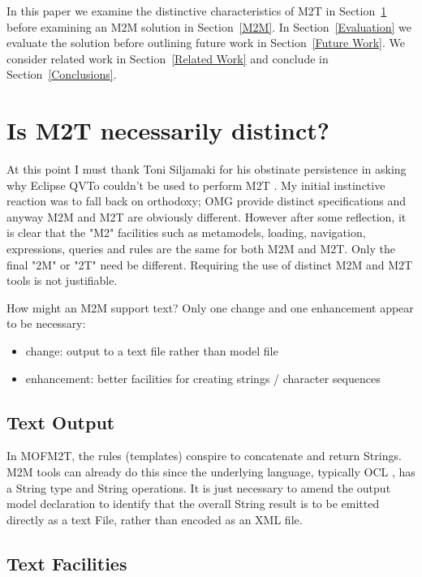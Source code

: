 \documentclass{llncs}
\begin{document}
In this paper we examine the distinctive characteristics of M2T in Section~\ref{M2T} before examining an M2M solution in Section~\ref{M2M}. In Section~\ref{Evaluation} we evaluate the solution before outlining future work in Section~\ref{Future Work}. We consider related work in Section~\ref{Related Work} and conclude in Section~\ref{Conclusions}. 

\section{Is M2T necessarily distinct?}\label{M2T}

At this point I must thank Toni Siljamaki for his obstinate persistence in asking why Eclipse QVTo couldn't be used to perform M2T \cite{Bug396543}. My initial instinctive reaction was to fall back on orthodoxy; OMG provide distinct specifications and anyway M2M and M2T are obviously different. However after some reflection, it is clear that the "M2" facilities such as metamodels, loading, navigation, expressions, queries and rules are the same for both M2M and M2T. Only the final "2M" or "2T" need be different. Requiring the use of distinct M2M and M2T tools is not justifiable.

How might an M2M support text? Only one change and one enhancement appear to be necessary:

\begin{itemize}
	\item change: output to a text file rather than model file
	\item enhancement: better facilities for creating strings / character sequences
\end{itemize}

\subsection{Text Output}\label{Text Output}

In MOFM2T, the rules (templates) conspire to concatenate and return Strings. M2M tools can already do this since the underlying language, typically OCL \cite{OCL-2.4}, has a String type and String operations. It is just necessary to amend the output model declaration to identify that the overall String result is to be emitted directly as a text File, rather than encoded as an XML file.

\subsection{Text Facilities}\label{Text Facilities}
\end{document}
